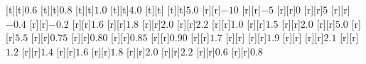 \begin{psfrags}
[t][t]{$0.6$}%
[t][t]{$0.8$}%
[t][t]{$1.0$}%
[t][t]{$4.0$}%
[t][t]{}%
[t][t]{$5.0$}%
%
[r][r]{$-10$}%
[r][r]{$-5$}%
[r][r]{$0$}%
[r][r]{$5$}%
[r][r]{$-0.4$}%
[r][r]{$-0.2$}%
[r][r]{$1.6$}%
[r][r]{$1.8$}%
[r][r]{$2.0$}%
[r][r]{$2.2$}%
[r][r]{$1.0$}%
[r][r]{$1.5$}%
[r][r]{$2.0$}%
[r][r]{$5.0$}%
[r][r]{$5.5$}%
[r][r]{$0.75$}%
[r][r]{$0.80$}%
[r][r]{$0.85$}%
[r][r]{$0.90$}%
[r][r]{$1.7$}%
[r][r]{}%
[r][r]{$1.9$}%
[r][r]{}%
[r][r]{$2.1$}%
[r][r]{$1.2$}%
[r][r]{$1.4$}%
[r][r]{$1.6$}%
[r][r]{$1.8$}%
[r][r]{$2.0$}%
[r][r]{$2.2$}%
[r][r]{$0.6$}%
[r][r]{$0.8$}%
%
%
\end{psfrags}%
%
